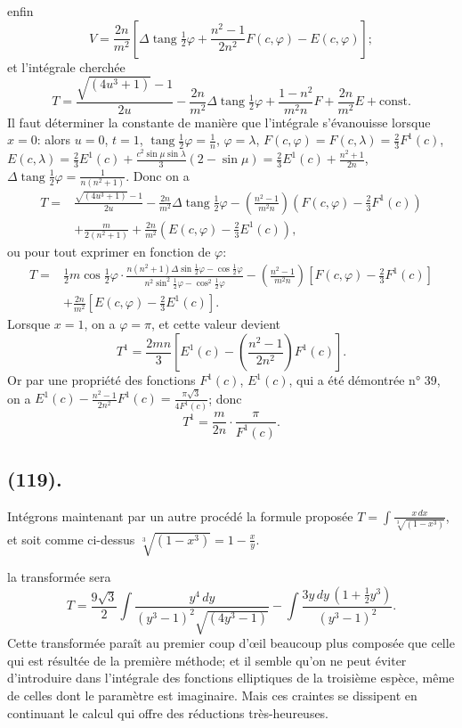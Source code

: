 \documentclass{article}
\begin{document}
enfin
\[ V=\frac{2n}{m^{2}}\left[\Delta\operatorname{tang}\tfrac{1}{2}\varphi+\frac{n^{2}-1}{2n^{2}}F(c,\varphi)-E(c,\varphi)\right]; \]
et l'intégrale cherchée
\[ T=\frac{\sqrt{(4u^{3}+1)}-1}{2u}-\frac{2n}{m^{2}}\Delta\operatorname{tang}\tfrac{1}{2}\varphi+\frac{1-n^{2}}{m^{2}n}F+\frac{2n}{m^{2}}E+\text{const.} \]
Il faut déterminer la constante de manière que l'intégrale s'évanouisse lorsque $x=0$: alors $u=0$, $t=1$, $\operatorname{tang}\frac{1}{2}\varphi=\frac{1}{n}$, $\varphi=\lambda$, $F(c,\varphi)=F(c,\lambda)=\frac{2}{3}F^{1}(c)$, $E(c,\lambda)=\frac{2}{3}E^{1}(c)+\frac{c^{2}\sin\mu\sin\lambda}{3}(2-\sin\mu)=\frac{2}{3}E^{1}(c)+\frac{n^{2}+1}{2n}$, $\Delta\operatorname{tang}\frac{1}{2}\varphi=\frac{1}{n(n^{2}+1)}$. Donc on a
\[ \begin{aligned} T={}&\frac{\sqrt{(4u^{3}+1)}-1}{2u}-\frac{2n}{m^{2}}\Delta\operatorname{tang}\tfrac{1}{2}\varphi-\left(\frac{n^{2}-1}{m^{2}n}\right)(F(c,\varphi)-\tfrac{2}{3}F^{1}(c))\\ &+\frac{m}{2(n^{2}+1)}+\frac{2n}{m^{2}}(E(c,\varphi)-\tfrac{2}{3}E^{1}(c)), \end{aligned} \]
ou pour tout exprimer en fonction de $\varphi$:
\[ \begin{aligned} T={}&\tfrac{1}{2}m\cos\tfrac{1}{2}\varphi\cdot\frac{n(n^{2}+1)\Delta\sin\tfrac{1}{2}\varphi-\cos\tfrac{1}{2}\varphi}{n^{2}\sin^{2}\tfrac{1}{2}\varphi-\cos^{2}\tfrac{1}{2}\varphi}-\left(\frac{n^{2}-1}{m^{2}n}\right)[F(c,\varphi)-\tfrac{2}{3}F^{1}(c)]\\ &+\frac{2n}{m^{2}}[E(c,\varphi)-\tfrac{2}{3}E^{1}(c)]. \end{aligned} \]
Lorsque $x=1$, on a $\varphi=\pi$, et cette valeur devient
\[ T^{1}=\frac{2mn}{3}\left[E^{1}(c)-\left(\frac{n^{2}-1}{2n^{2}}\right)F^{1}(c)\right]. \]
Or par une propriété des fonctions $F^{1}(c)$, $E^{1}(c)$, qui a été démontrée n° 39, on a $E^{1}(c)-\frac{n^{2}-1}{2n^{2}}F^{1}(c)=\frac{\pi\sqrt{3}}{4F^{1}(c)}$; donc
\[ T^{1}=\frac{m}{2n}\cdot\frac{\pi}{F^{1}(c)}. \]

\subsection*{(119).}

Intégrons maintenant par un autre procédé la formule proposée $T=\displaystyle\int\frac{x\,dx}{\sqrt[3]{(1-x^{3})}}$, et soit comme ci-dessus $\sqrt[3]{(1-x^{3})}=1-\frac{x}{y}$.

la transformée sera
\[ T=\frac{9\sqrt{3}}{2}\int\frac{y^{4}\,dy}{(y^{3}-1)^{2}\sqrt{(4y^{3}-1)}}-\int\frac{3y\,dy\,(1+\tfrac{1}{2}y^{3})}{(y^{3}-1)^{2}}. \]
Cette transformée paraît au premier coup d'œil beaucoup plus composée que celle qui est résultée de la première méthode; et il semble qu'on ne peut éviter d'introduire dans l'intégrale des fonctions elliptiques de la troisième espèce, même de celles dont le paramètre est imaginaire. Mais ces craintes se dissipent en continuant le calcul qui offre des réductions très-heureuses.
\end{document}
